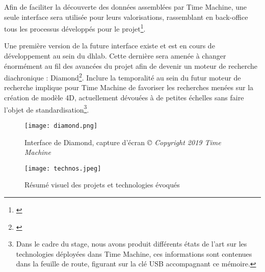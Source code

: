 \begin{enumerate}
Afin de faciliter la découverte des données assemblées par Time Machine, une seule interface sera utilisée pour leurs valorisations, rassemblant en back-office tous les processus développés pour le projet\footnote{\cite{epfl.dhlab_dh_2019}}. 

Une première version de la future interface existe et est en cours de développement au sein du \gls{dhlab}. Cette dernière sera amenée à changer énormément au fil des avancées du projet afin de devenir un moteur de recherche diachronique : Diamond\footnote{\cite{time_machine_diamond_nodate}}.
Inclure la temporalité au sein du futur moteur de recherche implique pour Time Machine de favoriser les recherches menées sur la création de modèle 4D, actuellement dévouées à de petites échelles sans faire l'objet de standardisation\footnote{Dans le cadre du stage, nous avons produit différents états de l'art sur les technologies déployées dans Time Machine, ces informations sont contenues dans la feuille de route, figurant sur la clé USB accompagnant ce mémoire.}.
\end{enumerate}
\newpage
\begin{figure}[H]%
\centering
\texttt{[image: diamond.png]}
\caption{Interface de Diamond, capture d'écran \textit{© Copyright 2019 Time Machine}}
\end{figure}

\begin{figure}[H]%
\centering
\texttt{[image: technos.jpeg]}
\caption{Résumé visuel des projets et technologies évoqués}
\end{figure}

